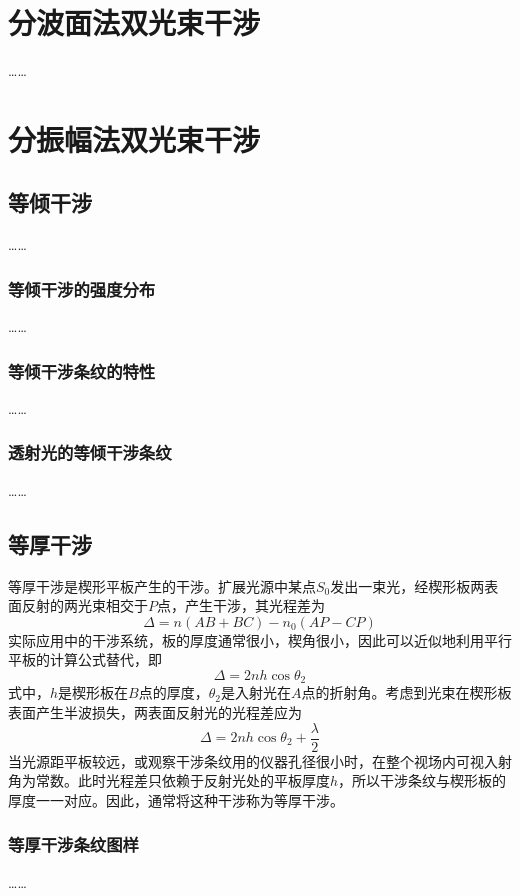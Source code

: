 \documentclass[cn,10pt,chinesefont=founder,math=mtpro2,cite=super,toc=onecol,twoside]{elegantbook}
\begin{document}
\section{分波面法双光束干涉}
……

\section{分振幅法双光束干涉}
\subsection{等倾干涉}
……
\subsubsection{等倾干涉的强度分布}
……
\subsubsection{等倾干涉条纹的特性}
……
\subsubsection{透射光的等倾干涉条纹}
……

\subsection{等厚干涉}
等厚干涉是楔形平板产生的干涉。扩展光源中某点$S_0$发出一束光，经楔形板两表面反射的两光束相交于$P$点，产生干涉，其光程差为
\begin{equation}
\varDelta=n(AB+BC)-n_0(AP-CP)
\end{equation}
实际应用中的干涉系统，板的厚度通常很小，楔角很小，因此可以近似地利用平行平板的计算公式替代，即
\begin{equation}
\varDelta=2nh\cos\theta_2
\end{equation}
式中，$h$是楔形板在$B$点的厚度，$\theta_2$是入射光在$A$点的折射角。考虑到光束在楔形板表面产生半波损失，两表面反射光的光程差应为
\begin{equation}
\varDelta=2nh\cos\theta_2+\frac{\lambda}{2}
\end{equation}
当光源距平板较远，或观察干涉条纹用的仪器孔径很小时，在整个视场内可视入射角为常数。此时光程差只依赖于反射光处的平板厚度$h$，所以干涉条纹与楔形板的厚度一一对应。因此，通常将这种干涉称为等厚干涉。

\subsubsection{等厚干涉条纹图样}
……
\end{document}
